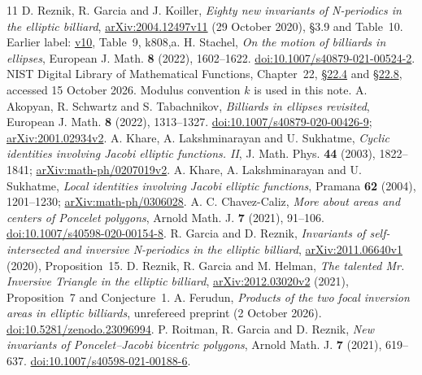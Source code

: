 \documentclass[11pt]{article}
\begin{document}
{\small
\begin{thebibliography}{11}
 D. Reznik, R. Garcia and J. Koiller, \emph{Eighty new invariants of N-periodics in the elliptic billiard}, \href{https://arxiv.org/abs/2004.12497v11}{arXiv:2004.12497v11} (29 October 2020), \S3.9 and Table~10. Earlier label: \href{https://arxiv.org/abs/2004.12497v10}{v10}, Table~9, k808,a.
 H. Stachel, \emph{On the motion of billiards in ellipses}, European J. Math. \textbf{8} (2022), 1602--1622. \href{https://doi.org/10.1007/s40879-021-00524-2}{doi:10.1007/s40879-021-00524-2}.
 NIST Digital Library of Mathematical Functions, Chapter~22, \href{https://dlmf.nist.gov/22.4}{\S22.4} and \href{https://dlmf.nist.gov/22.8}{\S22.8}, accessed 15 October 2026. Modulus convention $k$ is used in this note.
 A. Akopyan, R. Schwartz and S. Tabachnikov, \emph{Billiards in ellipses revisited}, European J. Math. \textbf{8} (2022), 1313--1327. \href{https://doi.org/10.1007/s40879-020-00426-9}{doi:10.1007/s40879-020-00426-9}; \href{https://arxiv.org/abs/2001.02934v2}{arXiv:2001.02934v2}.
 A. Khare, A. Lakshminarayan and U. Sukhatme, \emph{Cyclic identities involving Jacobi elliptic functions. II}, J. Math. Phys. \textbf{44} (2003), 1822--1841; \href{https://arxiv.org/abs/math-ph/0207019v2}{arXiv:math-ph/0207019v2}.
 A. Khare, A. Lakshminarayan and U. Sukhatme, \emph{Local identities involving Jacobi elliptic functions}, Pramana \textbf{62} (2004), 1201--1230; \href{https://arxiv.org/abs/math-ph/0306028}{arXiv:math-ph/0306028}.
 A. C. Chavez-Caliz, \emph{More about areas and centers of Poncelet polygons}, Arnold Math. J. \textbf{7} (2021), 91--106. \href{https://doi.org/10.1007/s40598-020-00154-8}{doi:10.1007/s40598-020-00154-8}.
 R. Garcia and D. Reznik, \emph{Invariants of self-intersected and inversive N-periodics in the elliptic billiard}, \href{https://arxiv.org/abs/2011.06640v1}{arXiv:2011.06640v1} (2020), Proposition~15.
 D. Reznik, R. Garcia and M. Helman, \emph{The talented Mr. Inversive Triangle in the elliptic billiard}, \href{https://arxiv.org/abs/2012.03020v2}{arXiv:2012.03020v2} (2021), Proposition~7 and Conjecture~1.
 A. Ferudun, \emph{Products of the two focal inversion areas in elliptic billiards}, unrefereed preprint (2 October 2026). \href{https://doi.org/10.5281/zenodo.23096994}{doi:10.5281/zenodo.23096994}.
 P. Roitman, R. Garcia and D. Reznik, \emph{New invariants of Poncelet--Jacobi bicentric polygons}, Arnold Math. J. \textbf{7} (2021), 619--637. \href{https://doi.org/10.1007/s40598-021-00188-6}{doi:10.1007/s40598-021-00188-6}.
\end{thebibliography}
}
\end{document}
